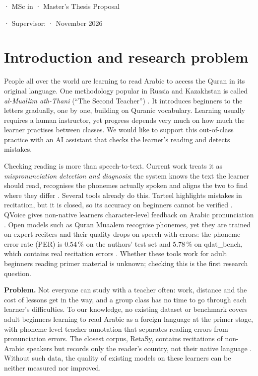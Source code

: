 \documentclass[a4paper,14pt]{extarticle}
\begin{document}
\thispagestyle{plain}
\begin{center}
{\small \thesisUniversityEn{} · MSc in \thesisSpecialtyEn{} · Master's Thesis Proposal}\\[8pt]
{\large\bfseries \thesisTopicEn\par}
\vspace{6pt}
{\thesisAuthorEn} · Supervisor: \thesisSupervisorEn{} · November 2026
\end{center}

\section{Introduction and research problem}

People all over the world are learning to read Arabic to access the Quran in its original language. One
methodology popular in Russia and Kazakhstan is called \emph{al-Muallim ath-Thani} (``The Second Teacher'')
\cite{SRC-040}. It introduces beginners to the letters gradually, one by one, building on Quranic vocabulary.
Learning usually requires a human instructor, yet progress depends very much on how much the learner practises
between classes. We would like to support this out-of-class practice with an AI assistant that checks the
learner's reading and detects mistakes.

Checking reading is more than speech-to-text. Current work treats it as \emph{mispronunciation detection and
diagnosis}: the system knows the text the learner should read, recognises the phonemes actually spoken and
aligns the two to find where they differ \cite{SRC-031}. Several tools already do this. Tarteel highlights
mistakes in recitation, but it is closed, so its accuracy on beginners cannot be verified \cite{SRC-046}.
QVoice gives non-native learners character-level feedback on Arabic pronunciation \cite{SRC-150}. Open models
such as Quran Muaalem recognise phonemes, yet they are trained on expert reciters and their quality drops on
speech with errors: the phoneme error rate (PER) is 0.54\,\% on the authors' test set and 5.78\,\% on
qdat\_bench, which contains real recitation errors \cite{SRC-002}. Whether these tools work for adult
beginners reading primer material is unknown; checking this is the first research question.

\textbf{Problem.} Not everyone can study with a teacher often: work, distance and the cost of lessons get in
the way, and a group class has no time to go through each learner's difficulties. To our knowledge, no
existing dataset or benchmark covers adult beginners learning to read Arabic as a foreign language at the
primer stage, with phoneme-level teacher annotation that separates reading errors from pronunciation errors.
The closest corpus, RetaSy, contains recitations of non-Arabic speakers but records only the reader's
country, not their native language \cite{SRC-032}. Without such data, the quality of existing models on these
learners can be neither measured nor improved.
\end{document}
